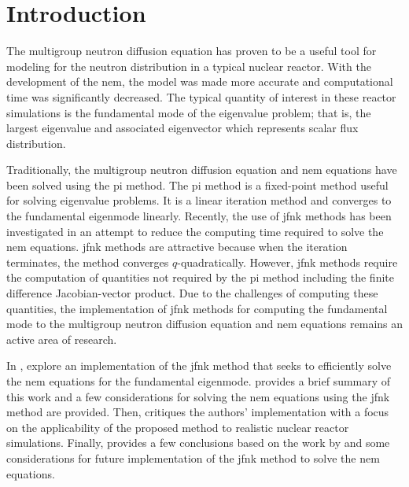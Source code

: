 \section{Introduction}
\label{sec:introduction}

  The multigroup neutron diffusion equation has proven to be a useful tool for
  modeling for the neutron distribution in a typical nuclear reactor. With the
  development of the \gls{nem}, the model was made more accurate and
  computational time was significantly decreased. The typical quantity of
  interest in these reactor simulations is the fundamental mode of the
  eigenvalue problem; that is, the largest eigenvalue and associated eigenvector
  which represents scalar flux distribution.

  Traditionally, the multigroup neutron diffusion equation and \gls{nem}
  equations have been solved using the \gls{pi} method. The \gls{pi} method is a
  fixed-point method useful for solving eigenvalue problems. It is a linear
  iteration method and converges to the fundamental eigenmode linearly.
  Recently, the use of \gls{jfnk} methods has been investigated in an attempt to
  reduce the computing time required to solve the \gls{nem} equations.
  \gls{jfnk} methods are attractive because when the iteration terminates, the
  method converges $q$-quadratically. However, \gls{jfnk} methods require the
  computation of quantities not required by the \gls{pi} method including the
  finite difference Jacobian-vector product. Due to the challenges of computing
  these quantities, the implementation of \gls{jfnk} methods for computing the
  fundamental mode to the multigroup neutron diffusion equation and \gls{nem}
  equations remains an active area of research.

  In , \citeauthor{qe2paper} explore an implementation of
  the \gls{jfnk} method that seeks to efficiently solve the \gls{nem} equations
  for the fundamental eigenmode.  provides a brief summary of
  this work and a few considerations for solving the \gls{nem} equations using
  the \gls{jfnk} method are provided. Then,  critiques the
  authors' implementation with a focus on the applicability of the proposed
  method to realistic nuclear reactor simulations. Finally,
   provides a few conclusions based on the work by
  \citeauthor{qe2paper} and some considerations for future implementation of the 
  \gls{jfnk} method to solve the \gls{nem} equations.
